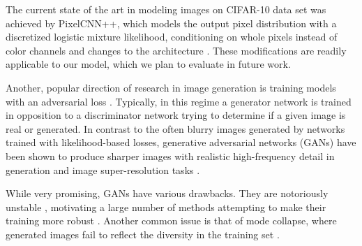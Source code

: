 \documentclass{article}
\begin{document}
The current state of the art in modeling images on CIFAR-10 data set was achieved by PixelCNN++, which models the output pixel distribution with a discretized logistic mixture likelihood, conditioning on whole pixels instead of color channels and changes to the architecture \citep{PixelCNNpp}. These modifications are readily applicable to our model, which we plan to evaluate in future work.

Another, popular direction of research in image generation is training models with an adversarial loss \citep{gan}. Typically, in this regime a generator network is trained in opposition to a discriminator network trying to determine if a given image is real or generated. In contrast to the often blurry images generated by networks trained with likelihood-based losses, generative adversarial networks (GANs) have been shown to produce sharper images with realistic high-frequency detail in generation and image super-resolution tasks \citep{StackGAN, SRGAN}.

While very promising, GANs have various drawbacks.
They are notoriously unstable \citep{DCGAN}, motivating a large number of methods attempting to make their training more robust \citep{unrolled_gans, began}. Another common issue is that of mode collapse, where generated images fail to reflect the diversity in the training set \citep{unrolled_gans}.
\end{document}
